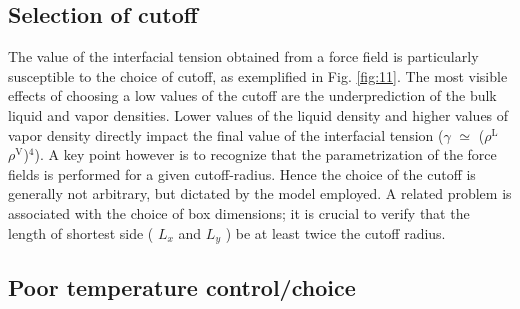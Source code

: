 \documentclass[9pt,tutorial]{livecoms}
\begin{document}
\subsection{Selection of cutoff}

The value of the interfacial tension obtained from a force field is
particularly susceptible to the choice of cutoff, as exemplified in Fig. \ref{fig:11}.
The most visible effects of choosing a low values of the cutoff are the 
underprediction of the bulk liquid and vapor densities. Lower values of the liquid density
and higher values of vapor density directly impact the final value of the
interfacial tension ({${\gamma}$}  ${\simeq}$ (${\rho}^{\mathrm{L}}$
\textendash{} ${\rho}^{\mathrm{V}}$)$^{4}$).
A key point however is to recognize that the parametrization of the force
fields is performed for a given cutoff-radius. Hence the choice of the cutoff
is generally not arbitrary, but dictated by the model employed. 
A related problem is associated with the choice of box dimensions; it is crucial to verify that the length of shortest side
( $L_{x}$ and $L_{y}$ ) be at least twice the cutoff radius.

\subsection{Poor temperature control/choice}
\end{document}
